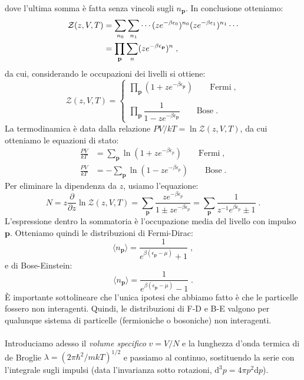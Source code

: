 \documentclass[10pt,a4paper]{report}
\theoremstyle{definition}
\numberwithin{equation}{section}
\newcommand{\diff}[1][]{\mathrm{d}#1}
\newcommand{\bra}{\langle}
\newcommand{\ket}{\rangle}
\newcommand{\zpart}{\mathcal{Z}}
\begin{document}
dove l'ultima somma è fatta senza vincoli sugli $n_{\mathbf{p}}$. In conclusione otteniamo:
\begin{align}
\zpart(z,V,T) &= \sum_{n_0}\sum_{n_1}\cdots (ze^{-\beta\epsilon_0})^{n_0}(ze^{-\beta\epsilon_1})^{n_1}\cdots \notag \\
&= \prod_{\mathbf{p}}\sum_n (ze^{-\beta\epsilon_{\mathbf{p}}})^n\;,
\end{align}
da cui, considerando le occupazioni dei livelli si ottiene:
\begin{equation}
\zpart(z,V,T)=\begin{cases}
\prod_{\mathbf{p}}(1+ze^{-\beta\epsilon_{\mathbf{p}}})\qquad \mbox{Fermi}\;, \\
\\
\prod_{\mathbf{p}}\dfrac{1}{1-ze^{-\beta\epsilon_{\mathbf{p}}}}\qquad \mbox{Bose}\;.
\end{cases}
\end{equation}
La termodinamica è data dalla relazione $PV/kT=\ln\zpart(z,V,T)$, da cui otteniamo le equazioni di stato:
\begin{align}
\frac{PV}{kT} &= \sum_{\mathbf{p}}\ln(1+ze^{-\beta\epsilon_p})\qquad \mbox{Fermi}\;, \\
\frac{PV}{kT} &= -\sum_{\mathbf{p}}\ln(1-ze^{-\beta\epsilon_p})\qquad \mbox{Bose}\;.
\end{align}
Per eliminare la dipendenza da $z$, usiamo l'equazione:
\begin{equation}
N=z\frac{\partial}{\partial z}\ln\zpart(z,V,T)=\sum_{\mathbf{p}}\frac{ze^{-\beta\epsilon_p}}{1\pm ze^{-\beta\epsilon_p}}=\sum_{\mathbf{p}}\frac{1}{z^{-1}e^{\beta\epsilon_p}\pm 1}\;.
\end{equation}
L'espressione dentro la sommatoria è l'occupazione media del livello con impulso $\mathbf{p}$. Otteniamo quindi le distribuzioni di Fermi-Dirac:
\begin{equation}
\bra n_{\mathbf{p}}\ket =\frac{1}{e^{\beta(\epsilon_{\mathbf{p}}-\mu)}+1}\;,
\end{equation}
e di Bose-Einstein:
\begin{equation}
\bra n_{\mathbf{p}}\ket=\frac{1}{e^{\beta(\epsilon_{\mathbf{p}}-\mu)}-1}\;.
\end{equation}
È importante sottolineare che l'unica ipotesi che abbiamo fatto è che le particelle fossero non interagenti. Quindi, le distribuzioni di F-D e B-E valgono per qualunque sistema di particelle (fermioniche o bosoniche) non interagenti. \\
\\
Introduciamo adesso il \emph{volume specifico} $v=V/N$ e la lunghezza d'onda termica di de Broglie $\lambda=(2\pi\hbar^2/mkT)^{1/2}$ e passiamo al continuo, sostituendo la serie con l'integrale sugli impulsi (data l'invarianza sotto rotazioni, $\diff^3{p}=4\pi p^2\diff{p}$).
\end{document}
